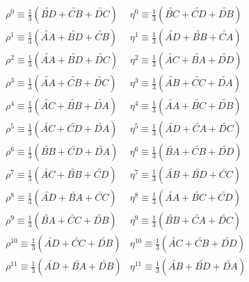 \documentclass{article}
\begin{document}
\begin{equation}
\begin{array}{ll}
     \rho^{0}\equiv\frac{1}{3}( \widetilde{BD}+\widetilde{CB}+\widetilde{DC}) & \eta^{0}\equiv\frac{1}{3}( \widetilde{BC}+\widetilde{CD}+\widetilde{DB})\\
     \rho^{1}\equiv\frac{1}{3}( \widetilde{AA}+\widetilde{BD}+\widetilde{CB}) & \eta^{1}\equiv\frac{1}{3}( \widetilde{AD}+\widetilde{BB}+\widetilde{CA})\\
     \rho^{2}\equiv\frac{1}{3}( \widetilde{AA}+\widetilde{BD}+\widetilde{DC}) & \eta^{2}\equiv\frac{1}{3}( \widetilde{AC}+\widetilde{BA}+\widetilde{DD})\\
     \rho^{3}\equiv\frac{1}{3}( \widetilde{AA}+\widetilde{CB}+\widetilde{DC}) & \eta^{3}\equiv\frac{1}{3}( \widetilde{AB}+\widetilde{CC}+\widetilde{DA})\\
     
     \rho^{4}\equiv\frac{1}{3}( \widetilde{AC}+\widetilde{BB}+\widetilde{DA}) & \eta^{4}\equiv\frac{1}{3}( \widetilde{AA}+\widetilde{BC}+\widetilde{DB})\\
     \rho^{5}\equiv\frac{1}{3}( \widetilde{AC}+\widetilde{CD}+\widetilde{DA}) & \eta^{5}\equiv\frac{1}{3}( \widetilde{AD}+\widetilde{CA}+\widetilde{DC})\\
     \rho^{6}\equiv\frac{1}{3}( \widetilde{BB}+\widetilde{CD}+\widetilde{DA}) & \eta^{6}\equiv\frac{1}{3}( \widetilde{BA}+\widetilde{CB}+\widetilde{DD})\\
     \rho^{7}\equiv\frac{1}{3}( \widetilde{AC}+\widetilde{BB}+\widetilde{CD}) & \eta^{7}\equiv\frac{1}{3}( \widetilde{AB}+\widetilde{BD}+\widetilde{CC})\\
     
     \rho^{8}\equiv\frac{1}{3}( \widetilde{AD}+\widetilde{BA}+\widetilde{CC}) & \eta^{8}\equiv\frac{1}{3}( \widetilde{AA}+\widetilde{BC}+\widetilde{CD})\\
     \rho^{9}\equiv\frac{1}{3}( \widetilde{BA}+\widetilde{CC}+\widetilde{DB}) & \eta^{9}\equiv\frac{1}{3}( \widetilde{BB}+\widetilde{CA}+\widetilde{DC})\\
     \rho^{10}\equiv\frac{1}{3}( \widetilde{AD}+\widetilde{CC}+\widetilde{DB}) & \eta^{10}\equiv\frac{1}{3}( \widetilde{AC}+\widetilde{CB}+\widetilde{DD})\\
     \rho^{11}\equiv\frac{1}{3}( \widetilde{AD}+\widetilde{BA}+\widetilde{DB}) & \eta^{11}\equiv\frac{1}{3}( \widetilde{AB}+\widetilde{BD}+\widetilde{DA})\\
     

\end{array}
\end{equation}
\end{document}
